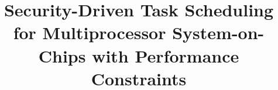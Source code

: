\documentclass[conference]{IEEEtran}
\begin{document}
%
\title{Security-Driven Task Scheduling for Multiprocessor System-on-Chips with Performance Constraints}
%




%
\end{document}
